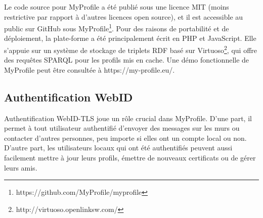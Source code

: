 \documentclass[a4paper]{article}
\begin{document}
Le code source pour MyProfile a été publié sous une licence MIT (moins restrictive par rapport à d'autres licences open source), et il est accessible au public sur GitHub sous MyProfile\footnote{https://github.com/MyProfile/myprofile}. Pour des raisons de portabilité et de déploiement, la plate-forme a été principalement écrit en PHP et JavaScript. Elle s'appuie sur un système de stockage de triplets RDF basé sur Virtuoso\footnote{http://virtuoso.openlinksw.com/}, qui offre des requêtes SPARQL pour les profils mis en cache. Une démo fonctionnelle de MyProfile peut être consultée à https://my-profile.eu/.


\subsection{Authentification WebID}
Authentification WebID-TLS joue un rôle crucial dans MyProfile. D'une part, il permet à tout utilisateur authentifié d'envoyer des messages sur les murs ou contacter d'autres personnes, peu importe si elles ont un compte local ou non. D'autre part, les utilisateurs locaux qui ont été authentifiés peuvent aussi facilement mettre à jour leurs profils, émettre de nouveaux certificats ou de gérer leurs amis.\\
\end{document}
